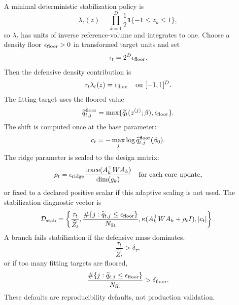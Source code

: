 \documentclass[11pt]{article}
\newcommand{\ind}{\mathbf 1}
\begin{document}
A minimal deterministic stabilization policy is
\[
    \lambda_t(z)=\prod_{k=1}^D\frac12\ind\{-1\le z_k\le1\},
    \label{eq:p24-p23-stab1}
\]
so \(\lambda_t\) has units of inverse reference-volume and integrates to one.
Choose a density floor \(\epsilon_{\rm floor}>0\) in transformed target units
and set
\[
    \tau_t=2^D\epsilon_{\rm floor}.
    \label{eq:p24-p23-stab2}
\]
Then the defensive density contribution is
\[
    \tau_t\lambda_t(z)=\epsilon_{\rm floor}
    \quad\text{on }[-1,1]^D.
    \label{eq:p24-p23-stab3}
\]
The fitting target uses the floored value
\[
    \widetilde q_{t,j}^{\rm floor}
    =
    \max\{\widetilde q_t(z^{(j)};\beta),\epsilon_{\rm floor}\}.
    \label{eq:p24-p23-stab4}
\]
The shift is computed once at the base parameter:
\[
    c_t
    =
    -\max_j\log \widetilde q_{t,j}^{\rm floor}(\beta_0).
    \label{eq:p24-p23-stab5}
\]
The ridge parameter is scaled to the design matrix:
\[
    \rho_t
    =
    \epsilon_{\rm ridge}
    \frac{\operatorname{trace}(A_k^\top W A_k)}
    {\dim(g_k)}
    \quad\text{for each core update,}
    \label{eq:p24-p23-stab6}
\]
or fixed to a declared positive scalar if this adaptive scaling is not used.
The stabilization diagnostic vector is
\[
    \mathcal D_{\rm stab}
    =
    \left\{
    \frac{\tau_t}{\widehat Z_t},
    \frac{\#\{j:\widetilde q_{t,j}\le\epsilon_{\rm floor}\}}{N_{\rm fit}},
    \kappa(A_k^\top W A_k+\rho_t I),
    |c_t|
    \right\}.
    \label{eq:p24-p23-stab7}
\]
A branch fails stabilization if the defensive mass dominates,
\[
    \frac{\tau_t}{\widehat Z_t}>\delta_\tau,
    \label{eq:p24-p23-stab8}
\]
or if too many fitting targets are floored,
\[
    \frac{\#\{j:\widetilde q_{t,j}\le\epsilon_{\rm floor}\}}{N_{\rm fit}}
    >
    \delta_{\rm floor}.
    \label{eq:p24-p23-stab9}
\]
These defaults are reproducibility defaults, not production validation.
\end{document}
